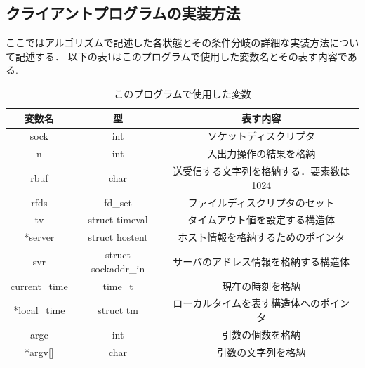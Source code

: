 \documentclass[dvipdfmx]{jarticle}
\begin{document}
\subsection{クライアントプログラムの実装方法}
ここではアルゴリズムで記述した各状態とその条件分岐の詳細な実装方法について記述する．
以下の表1はこのプログラムで使用した変数名とその表す内容である.
\begin{table}[h]
    \centering
    \begin{tabular}{|c|c|c|}
        \hline
        変数名 & 型 & 表す内容\\\hline\hline
        sock & int & ソケットディスクリプタ\\\hline
        n & int & 入出力操作の結果を格納\\\hline
        rbuf & char & 送受信する文字列を格納する．要素数は1024\\\hline
        rfds & fd\_set & ファイルディスクリプタのセット\\\hline
        tv & struct timeval & タイムアウト値を設定する構造体\\\hline
        *server & struct hostent & ホスト情報を格納するためのポインタ\\\hline
        svr & struct sockaddr\_in & サーバのアドレス情報を格納する構造体\\\hline
        current\_time & time\_t & 現在の時刻を格納\\\hline
        *local\_time & struct tm & ローカルタイムを表す構造体へのポインタ\\\hline
        argc & int & 引数の個数を格納\\\hline
        *argv[] & char & 引数の文字列を格納\\\hline
    \end{tabular}
    \caption{このプログラムで使用した変数}
\end{table}
\end{document}
